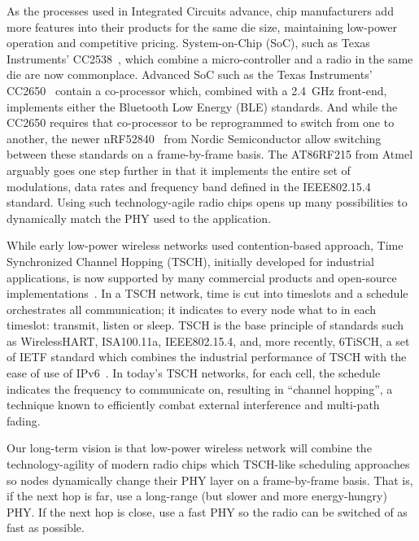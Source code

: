 \documentclass[sensors,article,submit,moreauthors,pdftex]{Definitions/mdpi}
\begin{document}
As the processes used in Integrated Circuits advance, chip manufacturers add more features into their products for the same die size,
    maintaining low-power operation and
    competitive pricing.
System-on-Chip (SoC), such as Texas Instruments' CC2538~\cite{datasheet_cc2538}, which combine a micro-controller and a radio in the same die are now commonplace.
Advanced SoC such as the Texas Instruments' CC2650~\cite{datasheet_cc2650} contain a co-processor which, combined with a 2.4~GHz front-end, implements either the Bluetooth Low Energy (BLE) standards.
And while the CC2650 requires that co-processor to be reprogrammed to switch from one to another,
    the newer nRF52840~\cite{datasheet_nrf52840} from Nordic Semiconductor allow switching between these standards on a frame-by-frame basis.
The AT86RF215 from Atmel arguably goes one step further in that it implements the entire set of modulations, data rates and frequency band defined in the IEEE802.15.4 standard.
Using such technology-agile radio chips opens up many possibilities to dynamically match the PHY used to the application.


While early low-power wireless networks used contention-based approach,
    Time Synchronized Channel Hopping (TSCH), initially developed for industrial applications,
    is now supported by many commercial products and open-source implementations~\cite{watteyne16industrial}.
In a TSCH network, time is cut into timeslots and a schedule orchestrates all communication;
    it indicates to every node what to in each timeslot: transmit, listen or sleep.
TSCH is the base principle of standards such as WirelessHART, ISA100.11a, IEEE802.15.4, and, more recently, 6TiSCH, a set of IETF standard which combines the industrial performance of TSCH with the ease of use of IPv6~\cite{draft-ietf-6tisch-msf}.
In today's TSCH networks, for each cell, the schedule indicates the frequency to communicate on, resulting in ``channel hopping'', a technique known to efficiently combat external interference and multi-path fading.


Our long-term vision is that low-power wireless network will combine the technology-agility of modern radio chips which TSCH-like scheduling approaches so nodes dynamically change their PHY layer on a frame-by-frame basis.
That is, if the next hop is far,   use a long-range (but slower and more energy-hungry) PHY.
         If the next hop is close, use a fast PHY so the radio can be switched of as fast as possible.
\end{document}
